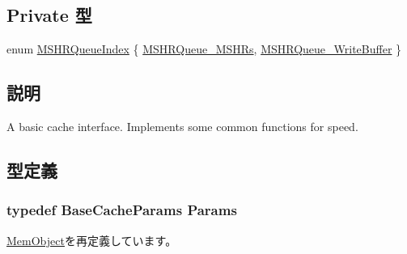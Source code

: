 \subsection*{Private 型}
\begin{DoxyCompactItemize}
\item 
enum \hyperlink{classBaseCache_a044898b3a082229405ecc19b5b26b144}{MSHRQueueIndex} \{ \hyperlink{classBaseCache_a044898b3a082229405ecc19b5b26b144ada8ec99f45021e0596a1bd0e9dfecfc2}{MSHRQueue\_\-MSHRs}, 
\hyperlink{classBaseCache_a044898b3a082229405ecc19b5b26b144a0eb759fee101138752a64fb5932353f7}{MSHRQueue\_\-WriteBuffer}
 \}
\end{DoxyCompactItemize}


\subsection{説明}
A basic cache interface. Implements some common functions for speed. 

\subsection{型定義}
\hypertarget{classBaseCache_a23c1728f4d2cabb1996560194937d427}{
\subsubsection[{Params}]{\setlength{\rightskip}{0pt plus 5cm}typedef BaseCacheParams {\bf Params}}}
\label{classBaseCache_a23c1728f4d2cabb1996560194937d427}


\hyperlink{classMemObject_a905bbc621eeec0ed08859e21c8c95412}{MemObject}を再定義しています。

